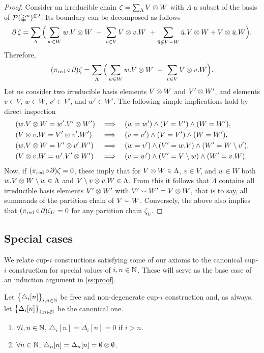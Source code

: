 \begin{proof}
	Consider an irreducible chain $\zeta = \sum_{\Lambda} V \otimes W$ with $\Lambda$ a subset of the basis of $\mathcal{P}(\mathbb{\Delta}^n)^{\otimes 2}$.
	Its boundary can be decomposed as follows
	\[
	\bd \zeta = \sum_{\Lambda} \Big(\sum_{w \in W} w.V \ot W \ + \ \sum_{v \in V} V \ot v.W \ +
	\sum_{\bar u \notin V \union W} \bar u.V \ot  W + V \ot \bar u.W\Big).
	\]
	Therefore,
	\[
	(\operatorname{\pi_{\text{red}}} \circ \operatorname{\partial}) \zeta = \sum_{\Lambda} \Big(\sum_{w \in W} w.V \otimes W \ + \ \sum_{v \in V} V \otimes v.W\Big).
	\]
	Let us consider two irreducible basis elements $V \otimes W$ and $V' \otimes W'$, and elements $v \in V$, $w \in W$, $v' \in V'$, and $w' \in W'$.
	The following simple implications hold by direct inspection
	\begin{align*}
		&(w.V \otimes W = w'.V' \otimes W') &\implies& &&(w = w') \wedge (V = V') \wedge (W = W'), \\
		&(V \otimes v.W = V' \otimes v'.W') &\implies& &&(v = v') \wedge (V = V') \wedge (W = W'), \\
		&(w.V \otimes W = V' \otimes v'.W') &\implies& &&(w = v') \wedge (V' = w.V) \wedge (W' = W \setminus v'), \\
		&(V \otimes v.W = w'.V' \otimes W') &\implies& &&(v = w') \wedge (V' = V \setminus w) \wedge (W' = v.W).
	\end{align*}
	Now, if $(\operatorname{\pi_{\text{red}}} \circ \operatorname{\partial}) \zeta = 0$, these imply that for $V \otimes W \in \Lambda$, $v \in V$, and $w \in W$ both $w.V \otimes W \setminus w \in \Lambda$ and $V \setminus v \otimes v.W \in \Lambda$.
	From this it follows that $\Lambda$ contains all irreducible basis elements $V' \otimes W'$ with $V' \union W' = V \ot W$, that is to say, all summands of the partition chain of $V \union W$.
	Conversely, the above also implies that $(\operatorname{\pi_{\text{red}}} \circ \operatorname{\partial})\zeta_U = 0$ for any partition chain $\zeta_U$.
\end{proof}

\subsection{Special cases}\label{ss:cases}


We relate cup-$i$ constructions satisfying some of our axioms to the canonical cup-$i$ construction for special values of $i,n \in \mathbb{N}$.
These will serve as the base case of an induction argument in \cref{ss:proof}.

\begin{lemma}\label{l:special case one}
	Let $\big\{ \triangle_i [n] \big\}_{i,n\in\mathbb{N}}$ be free and non-degenerate \mbox{cup-$i$} construction and, as always, let $\big\{ \Delta_i [n] \big\}_{i,n\in\mathbb{N}}$ be the canonical one.
	\begin{enumerate}
		\item \label{i:i>n} $\forall i,n \in \mathbb{N}$, $\triangle_i[n] = \Delta_i [n] = 0$ if $i > n$.
		\item \label{i:i=n} $\forall n \in \mathbb{N}$, $\triangle_n[n] = \Delta_n [n] = \emptyset \otimes \emptyset$.
	\end{enumerate}
\end{lemma}

